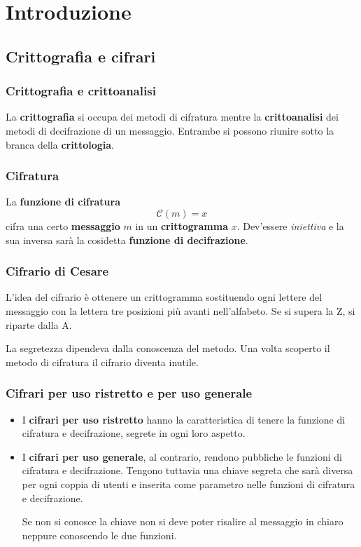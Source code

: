 \chapter{Introduzione}

\section{Crittografia e cifrari}

\subsection{Crittografia e crittoanalisi}
La \textbf{crittografia} si occupa dei metodi di cifratura mentre la
\textbf{crittoanalisi} dei metodi di decifrazione di un messaggio.
Entrambe si possono riunire sotto la branca della \textbf{crittologia}.

\subsection{Cifratura}
La \textbf{funzione di cifratura}
\[ \mathcal{C}(m) = x \]
cifra una certo \textbf{messaggio} $m$ in un \textbf{crittogramma} $x$. Dev'essere
\emph{iniettiva} e la sua inversa sar\`a la cosidetta \textbf{funzione di decifrazione}.

\subsection{Cifrario di Cesare}
L'idea del cifrario \`e ottenere un crittogramma sostituendo ogni lettere del messaggio
con la lettera tre posizioni pi\`u avanti nell'alfabeto. Se si supera la Z, si riparte
dalla A.

La segretezza dipendeva dalla conoscenza del metodo. Una volta scoperto il metodo di
cifratura il cifrario diventa inutile.

\subsection{Cifrari per uso ristretto e per uso generale}
\begin{itemize}
	\item I \textbf{cifrari per uso ristretto} hanno la caratteristica di tenere la
	      funzione di cifratura e decifrazione, segrete in ogni loro aspetto.
	\item I \textbf{cifrari per uso generale}, al contrario, rendono pubbliche le
	      funzioni di cifratura e decifrazione. Tengono tuttavia una chiave segreta che
	      sar\`a diversa per ogni coppia di utenti e inserita come parametro nelle
	      funzioni di cifratura e decifrazione.

	      Se non si conosce la chiave non si deve poter risalire al messaggio in chiaro
	      neppure conoscendo le due funzioni.
\end{itemize}

